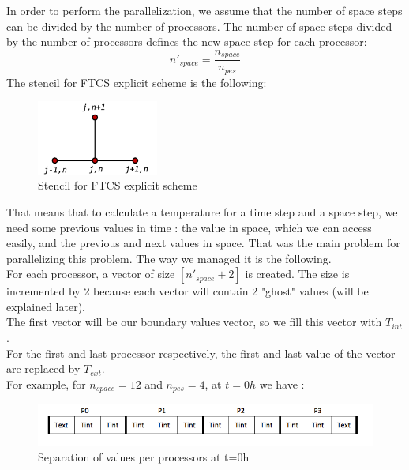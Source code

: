 \documentclass{article}
\begin{document}
            In order to perform the parallelization, we assume that the number of 
            space steps can be divided by the number of processors. The number of
            space steps divided by the number of processors defines the new space
            step for each processor:
            \begin{equation}
                n'_{space} = \frac{n_{space}}{n_{pes}}
            \end{equation}
            The stencil for FTCS explicit scheme is the following:
            \begin{figure}[H]
                \includegraphics[width=4cm]{stencil_explicit.png}
                \centering
                \caption{Stencil for FTCS explicit scheme}
            \end{figure}

            That means that to calculate a temperature for a time step and a space
            step, we need some previous values in time : the value in space, 
            which we can access easily, and the previous and next values in space.
            That was the main problem for parallelizing this problem. The way we managed
            it is the following.\\
            For each processor, a vector of size $[n'_{space} + 2]$ is created. The size is incremented
            by 2 because each vector will contain 2 "ghost" values (will be explained later).\\
            The first vector will be our boundary values vector, so we fill this vector
            with $T_{int}$.\\
            For the first and last processor respectively, the first and last value of the vector are
            replaced by $T_{ext}$.\\
            For example, for $n_{space} = 12$ and $n_{pes} = 4$, at $t=0h$ we have :
            \begin{figure}[H]
                \includegraphics[width=\textwidth]{separation.png}
                \caption{Separation of values per processors at t=0h}
            \end{figure}
\end{document}
